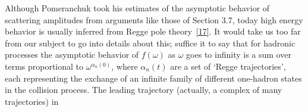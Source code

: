 Although Pomeranchuk took his estimates of the asymptotic behavior of
scattering amplitudes from arguments like those of Section 3.7, today high
energy behavior is usually inferred from Regge pole theory~\hyperref[ref:10.17]{[17]}.
It would take us too far from our subject to go into details about this;
suffice it to say that for hadronic processes the asymptotic behavior of
$f(\omega)$ as $\omega$ goes to infinity is a sum over terms proportional to
$\omega^{\alpha_n(0)}$, where $\alpha_n(t)$ are a set of `Regge trajectories',
each representing the exchange of an infinite family of different one-hadron
states in the collision process. The leading trajectory (actually, a complex
of many trajectories) in
